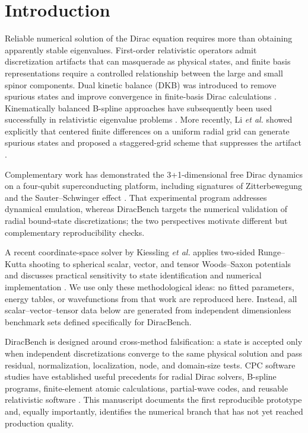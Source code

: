 \documentclass[a4paper,fleqn]{cas-dc}
\begin{document}
\section{Introduction}
Reliable numerical solution of the Dirac equation requires more than obtaining apparently stable eigenvalues. First-order relativistic operators admit discretization artifacts that can masquerade as physical states, and finite basis representations require a controlled relationship between the large and small spinor components. Dual kinetic balance (DKB) was introduced to remove spurious states and improve convergence in finite-basis Dirac calculations \cite{Shabaev2004,Beloy2008}. Kinematically balanced B-spline approaches have subsequently been used successfully in relativistic eigenvalue problems \cite{Fillion2012,Fischer2009,Toffoli2003,Poschl1998}. More recently, Li \emph{et al.} showed explicitly that centered finite differences on a uniform radial grid can generate spurious states and proposed a staggered-grid scheme that suppresses the artifact \cite{Li2026,FillionGourdeau2012,Lewin2010}.

Complementary work has demonstrated the 3+1-dimensional free Dirac dynamics on a four-qubit superconducting platform, including signatures of Zitterbewegung and the Sauter--Schwinger effect \cite{Zhang2025}. That experimental program addresses dynamical emulation, whereas DiracBench targets the numerical validation of radial bound-state discretizations; the two perspectives motivate different but complementary reproducibility checks.

A recent coordinate-space solver by Kiessling \emph{et al.} applies two-sided Runge--Kutta shooting to spherical scalar, vector, and tensor Woods--Saxon potentials and discusses practical sensitivity to state identification and numerical implementation \cite{Kiessling2025,FillionGourdeau2012,Beerwerth2015,Lorin2022}. We use only these methodological ideas: no fitted parameters, energy tables, or wavefunctions from that work are reproduced here. Instead, all scalar--vector--tensor data below are generated from independent dimensionless benchmark sets defined specifically for DiracBench.

DiracBench is designed around cross-method falsification: a state is accepted only when independent discretizations converge to the same physical solution and pass residual, normalization, localization, node, and domain-size tests. CPC software studies have established useful precedents for radial Dirac solvers, B-spline programs, finite-element atomic calculations, partial-wave codes, and reusable relativistic software \cite{Certik2013,Zatsarinny2016,Tsoulos2019,Waide2020,Certik2024,Elsepa2021,Poskus2018,Bagci2022}. This manuscript documents the first reproducible prototype and, equally importantly, identifies the numerical branch that has not yet reached production quality.
\end{document}
